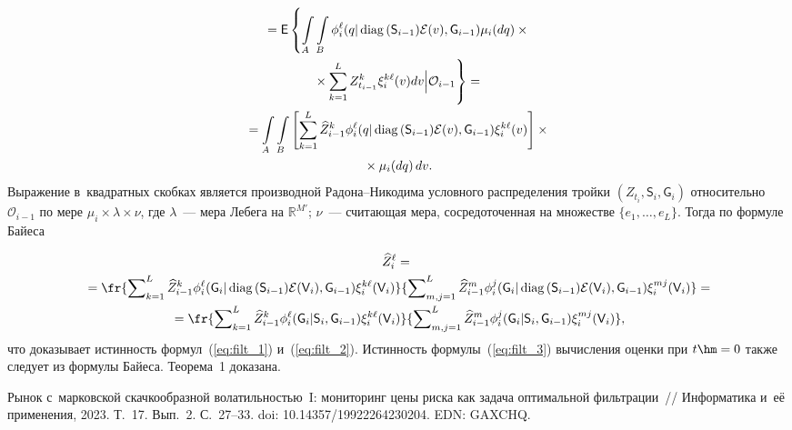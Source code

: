 \begin{multicols}{2}
{\noindent
\begin{multline*}
{}=
{\sf E}\left\{\int\limits_A\int\limits_B 
 \phi_i^{\ell}(q|\mathop{\mathrm{diag}\,}(\mathsf{S}_{i-1})\mathcal{E}(v),\mathsf{G}_{i-
1})\mu_i(dq)\times{}\right.\\
\left.{}\times \sum\limits_{k=1}^L Z_{t_{i-1}}^{k} \xi_i^{k\ell}(v) dv
\Bigl| \mathcal{O}_{i-1}
\vphantom{\int\limits_B}
\right\} = {}\\
{}=
\int\limits_A\int\limits_B
\left[
\sum_{k=1}^L \widehat{Z}_{i-1}^k
 \phi_i^{\ell}(q|\mathop{\mathrm{diag}\,}(\mathsf{S}_{i-1})\mathcal{E}(v),\mathsf{G}_{i-1})
  \xi_i^{k\ell}(v)
\right]\times{}\\
{}\times \mu_i(dq)\, dv.
\end{multline*}
Выражение в~квадратных скобках
является производной Ра\-до\-на--Ни\-ко\-ди\-ма условного распределения тройки $(Z_{t_i}, 
\mathsf{S}_{i}, \mathsf{G}_{i})$ относительно $\mathcal{O}_{i-1}$ по мере $\mu_i 
\times \lambda \times \nu$, где $\lambda$~--- мера Лебега на $\mathbb{R}^{M'}$; 
$\nu$~--- считающая мера, сосредоточенная на множестве $\{e_1,\ldots,e_L\}$. 
Тогда по формуле Байеса

\noindent
\begin{multline*}
\widehat{Z}_i^{\ell} ={}\\
{}=
\fr{\sum\nolimits_{k=1}^L \widehat{Z}_{i-1}^k
 \phi_i^{\ell}(\mathsf{G}_{i}|\diag(\mathsf{S}_{i-1})\mathcal{E}(\mathsf{V}_{i}),\mathsf{G}_{i-1})
  \xi_i^{k\ell}(\mathsf{V}_{i})}{\sum\nolimits_{m,j=1}^L \widehat{Z}_{i-1}^m
 \phi_i^{j}(\mathsf{G}_{i}|\diag(\mathsf{S}_{i-1})\mathcal{E}(\mathsf{V}_{i}),\mathsf{G}_{i-1})
  \xi_i^{mj}(\mathsf{V}_{i})} ={}\hspace*{-1.97446pt}\\
  {}=
  \fr{\sum\nolimits_{k=1}^L \widehat{Z}_{i-1}^k
 \phi_i^{\ell}(\mathsf{G}_{i}|\mathsf{S}_{i},\mathsf{G}_{i-1})
  \xi_i^{k\ell}(\mathsf{V}_{i})}{\sum\nolimits_{m,j=1}^L \widehat{Z}_{i-1}^m
 \phi_i^{j}(\mathsf{G}_{i}|\mathsf{S}_{i},\mathsf{G}_{i-1})
  \xi_i^{mj}(\mathsf{V}_{i})},
\end{multline*}
что доказывает истинность формул~(\ref{eq:filt_1}) и~(\ref{eq:filt_2}). 
Истинность формулы~(\ref{eq:filt_3}) вычисления оценки при $t\hm=0$ также следует 
из формулы Байеса.
Теорема~1 доказана.

}

{\small\frenchspacing
 {\baselineskip=10.6pt
 \begin{thebibliography}{99}
 Рынок с~марковской скачкообразной волатильностью~I: мониторинг 
цены риска как задача оптимальной фильтрации~// Информатика и~её 
применения, 2023. Т.~17. Вып.~2. С.~27--33. doi: 10.14357/19922264230204. EDN: GAXCHQ.


\end{thebibliography}}}
\end{multicols}
